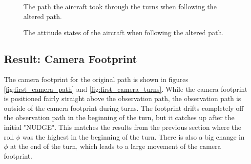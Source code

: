 \begin{figure}[!ht]
    \centering
    \caption{The path the aircraft took through the turns when following the altered path.}
	\label{fig:second_run_turns}
\end{figure}

\begin{figure}[!ht]
    \centering
    \caption{The attitude states of the aircraft when following the altered path.}
	\label{fig:second_run_states}
\end{figure}


\subsection{Result: Camera Footprint}

The camera footprint for the original path is shown in figures \ref{fig:first_camera_path} and \ref{fig:first_camera_turns}. While the camera footprint is positioned fairly straight above the observation path, the observation path is outside of the camera footprint during turns. The footprint drifts completely off the observation path in the beginning of the turn, but it catches up after the initial "NUDGE". This matches the results from the previous section where the roll $\phi$ was the highest in the beginning of the turn. There is also a big change in $\phi$ at the end of the turn, which leads to a large movement of the camera footprint.

